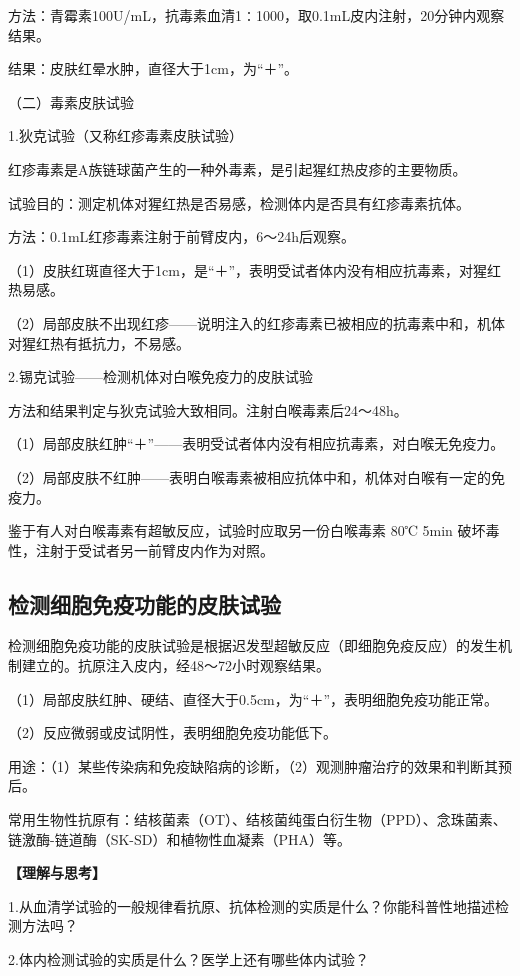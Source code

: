 方法：青霉素100U/mL，抗毒素血清1∶1000，取0.1mL皮内注射，20分钟内观察结果。

结果：皮肤红晕水肿，直径大于1cm，为“＋”。

（二）毒素皮肤试验

1.狄克试验（又称红疹毒素皮肤试验）

红疹毒素是A族链球菌产生的一种外毒素，是引起猩红热皮疹的主要物质。

试验目的：测定机体对猩红热是否易感，检测体内是否具有红疹毒素抗体。

方法：0.1mL红疹毒素注射于前臂皮内，6～24h后观察。

（1）皮肤红斑直径大于1cm，是“＋”，表明受试者体内没有相应抗毒素，对猩红热易感。

（2）局部皮肤不出现红疹------说明注入的红疹毒素已被相应的抗毒素中和，机体对猩红热有抵抗力，不易感。

2.锡克试验------检测机体对白喉免疫力的皮肤试验

方法和结果判定与狄克试验大致相同。注射白喉毒素后24～48h。

（1）局部皮肤红肿“＋”------表明受试者体内没有相应抗毒素，对白喉无免疫力。

（2）局部皮肤不红肿------表明白喉毒素被相应抗体中和，机体对白喉有一定的免疫力。

鉴于有人对白喉毒素有超敏反应，试验时应取另一份白喉毒素 80℃ 5min
破坏毒性，注射于受试者另一前臂皮内作为对照。


\subsection{检测细胞免疫功能的皮肤试验}

检测细胞免疫功能的皮肤试验是根据迟发型超敏反应（即细胞免疫反应）的发生机制建立的。抗原注入皮内，经48～72小时观察结果。

（1）局部皮肤红肿、硬结、直径大于0.5cm，为“＋”，表明细胞免疫功能正常。

（2）反应微弱或皮试阴性，表明细胞免疫功能低下。

用途：（1）某些传染病和免疫缺陷病的诊断，（2）观测肿瘤治疗的效果和判断其预后。

常用生物性抗原有：结核菌素（OT）、结核菌纯蛋白衍生物（PPD）、念珠菌素、链激酶-链道酶（SK-SD）和植物性血凝素（PHA）等。

\noindent\textbf{【理解与思考】}

1.从血清学试验的一般规律看抗原、抗体检测的实质是什么？你能科普性地描述检测方法吗？

2.体内检测试验的实质是什么？医学上还有哪些体内试验？

